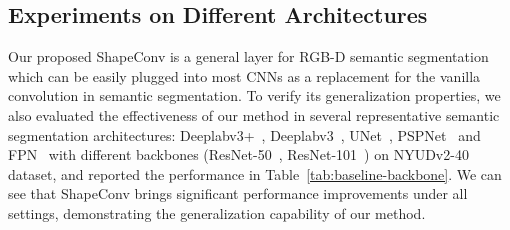 \begin{table}[h!]
  \centering
\caption{
\label{tab:SID-performance}
Performance comparison on SID dataset. The architectures of baseline and ours adopted in this table is deeplabv3+ with ResNet-101 backbone and the ``+'' denote the deltas relative to the baseline method.}


\end{table}  


\subsection{Experiments on Different Architectures}
\label{sec:diff ar}
\vspace{-0.2cm}
Our proposed ShapeConv is a general layer for RGB-D semantic segmentation which can be easily plugged into most CNNs as a replacement for the vanilla convolution in semantic segmentation. To verify its generalization properties, we also evaluated the effectiveness of our method in several representative semantic segmentation architectures: Deeplabv3+~\cite{chen2018encoder}, Deeplabv3~\cite{chen2017rethinking}, UNet~\cite{ronneberger2015u}, PSPNet~\cite{zhao2017pyramid} and FPN~\cite{lin2017feature} with different backbones (ResNet-50~\cite{he2016deep}, ResNet-101~\cite{he2016deep}) on NYUDv2-40 dataset, and reported the performance in Table~\ref{tab:baseline-backbone}. We can see that ShapeConv brings significant performance improvements under all settings, demonstrating the generalization capability of our method.

